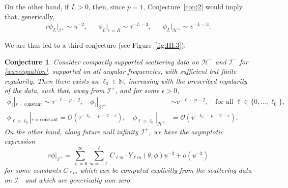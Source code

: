 \documentclass[11pt,english]{article}
\numberwithin{equation}{section}
\newtheorem{conj}{Conjecture}
\theoremstyle{remark}
\theoremstyle{plain}
\theoremstyle{remark}
\renewcommand{\(}{\left(}
\renewcommand{\)}{\right)}
\begin{document}
On the other hand, if $L>0$, then, since $p=1$, Conjecture~\ref{conj2} would imply that, generically,
\begin{align}
r\phi_L|_{\mathcal{I}^+}\sim u^{-2}, &&\phi_L|_{r=R}\sim \tau^{-L-3},&& \phi_L|_{\mathcal{H}^+}\sim v^{-L-3}.
\end{align}

We are thus led to a third conjecture (see Figure~\ref{fig:III:3}):
\begin{conj}\label{conj3}
Consider compactly supported scattering data on $\mathcal H^-$ and $\mathcal I^-$ for \eqref{waveequation}, {supported on all angular frequencies}, with sufficient but finite regularity. 
Then there exists an $\ell_0\in \mathbb N$, increasing with the prescribed regularity of the data, such that, away from $\mathcal I^+$, and for some $\epsilon>0$,
\begin{align}
\phi_\ell|_{r=\text{constant}}\sim \tau^{-\ell-p-2},\quad \phi_\ell|_{\mathcal{H}^+}&\sim v^{-\ell-p-2},\quad\text{for all } \ell\in\{0,\dots,\ell_0\},\\
\phi_{\ell>\ell_0}|_{r=\text{constant}}=\mathcal O( \tau^{-\ell_0-p-2-\epsilon}),\quad \phi_{\ell>\ell_0}|_{\mathcal{H}^+}&=\mathcal O( v^{-\ell_0-p-2-\epsilon}).
\end{align}
On the other hand, along future null infinity $\mathcal I^+$, we have the asymptotic expression
\begin{equation}\label{super}
r\phi|_{\mathcal I^+}=\sum_{\ell=0}^\infty\sum_{m=-\ell}^\ell C_{\ell m}\cdot Y_{\ell m}(\theta,\phi)u^{-2}+o(u^{-2})
\end{equation}
for some constants $C_{\ell m}$ which can be computed explicitly from the scattering data on $\mathcal I^-$ and which are generically non-zero.
\end{conj}
\end{document}
